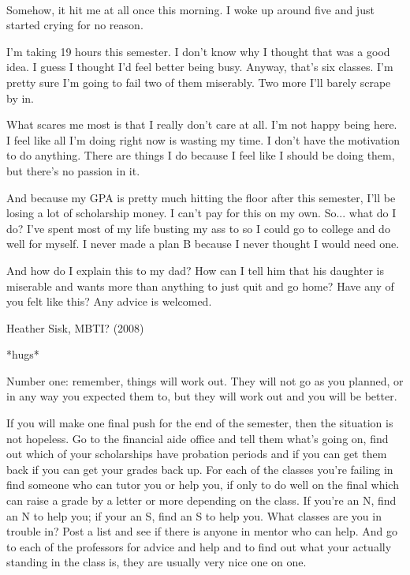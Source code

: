 \vspace{0.5cm}
\begin{center}
\setlength{\fboxrule}{1.5pt}
 \\[0.3cm]
\begin{changemargin}{0.5cm}{0.5cm}

 Somehow, it hit me at all once this morning.  I woke up around five and just started crying for no reason.
 
I'm taking 19 hours this semester.  I don't know why I thought that was a good idea.  I guess I thought I'd feel better being busy.  Anyway, that's six classes.  I'm pretty sure I'm going to fail two of them miserably.  Two more I'll barely scrape by in.

What scares me most is that I really don't care at all.  I'm not happy being here.  I feel like all I'm doing right now is wasting my time.  I don't have the motivation to do anything.  There are things I do because I feel like I should be doing them, but there's no passion in it.

And because my GPA is pretty much hitting the floor after this semester, I'll be losing a lot of scholarship money.  I can't pay for this on my own.
So...  what do I do?  I've spent most of my life busting my ass to so I could go to college and do well for myself.  I never made a plan B because I never thought I would need one.

And how do I explain this to my dad?  How can I tell him that his daughter is miserable and wants more than anything to just quit and go home?
Have any of you felt like this?  Any advice is welcomed.

\begin{flushright}
	Heather Sisk, MBTI? (2008)
\end{flushright}

\mbox{}\hfill * \hfill * \hfill * \hfill\mbox{}

*hugs*

Number one: remember, things will work out.  They will not go as you planned, or in any way you expected them to, but they will work out and you will be better.

If you will make one final push for the end of the semester, then the situation is not hopeless.  Go to the financial aide office and tell them what's going on, find out which of your scholarships have probation periods and if you can get them back if you can get your grades back up.  For each of the classes you're failing in find someone who can tutor you or help you, if only to do well on the final which can raise a grade by a letter or more depending on the class.  If you're an N, find an N to help you; if your an S, find an S to help you.  What classes are you in trouble in?  Post a list and see if there is anyone in mentor who can help.  And go to each of the professors for advice and help and to find out what your actually standing in the class is, they are usually very nice one on one.


\end{changemargin}
\end{center}
